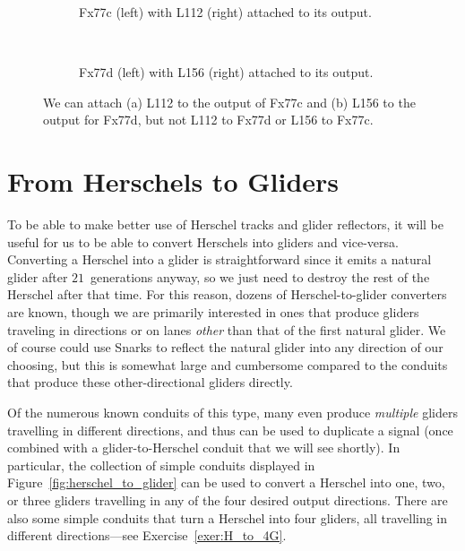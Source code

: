 \begin{figure}[!htb]
	\centering
	\begin{subfigure}{.5\textwidth}
		\centering
		\caption{Fx77c (left) with L112 (right) attached to its output.}
		\label{fig:fx77c_l112}
	\end{subfigure}\ \ \ \ %
	\begin{subfigure}{.47\textwidth}
		\centering
		\caption{Fx77d (left) with L156 (right) attached to its output.}
		\label{fig:fx77d_l156}
	\end{subfigure}
	\caption{We can attach (a) L112 to the output of Fx77c and (b) L156 to the output for Fx77d, but not L112 to Fx77d or L156 to Fx77c.}\label{fig:fx77_variants_with_l}
\end{figure}


\section{From Herschels to Gliders}\label{sec:herschels_to_gliders}

To be able to make better use of Herschel tracks and glider reflectors, it will be useful for us to be able to convert Herschels into gliders and vice-versa. Converting a Herschel into a glider is straightforward since it emits a natural glider after $21$~generations anyway, so we just need to destroy the rest of the Herschel after that time. For this reason, dozens of Herschel-to-glider converters are known, though we are primarily interested in ones that produce gliders traveling in directions or on lanes \emph{other} than that of the first natural glider. We of course could use Snarks to reflect the natural glider into any direction of our choosing, but this is somewhat large and cumbersome compared to the conduits that produce these other-directional gliders directly.

Of the numerous known conduits of this type, many even produce \emph{multiple} gliders travelling in different directions, and thus can be used to duplicate a signal (once combined with a glider-to-Herschel conduit that we will see shortly). In particular, the collection of simple conduits displayed in Figure~\ref{fig:herschel_to_glider} can be used to convert a Herschel into one, two, or three gliders travelling in any of the four desired output directions. There are also some simple conduits that turn a Herschel into four gliders, all travelling in different directions---see Exercise~\ref{exer:H_to_4G}.

